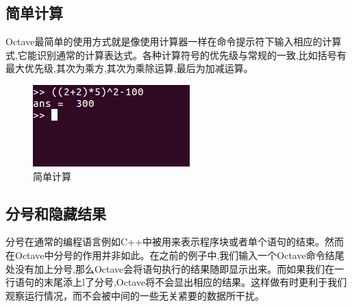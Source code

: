 \documentclass[a4paper,11pt]{ctexart}
\begin{document}
\subsection{简单计算}
Octave最简单的使用方式就是像使用计算器一样在命令提示符下输入相应的计算式,它能识别通常的计算表达式。各种计算符号的优先级与常规的一致,比如括号有最大优先级,其次为乘方,其次为乘除运算,最后为加减运算。
\begin{figure}[H]
	\begin{center}
		\includegraphics[width=.6\textwidth]{simplecal.png}
	\end{center}
	\caption{简单计算}
\end{figure}
\subsection{分号和隐藏结果}
分号在通常的编程语言例如C++中被用来表示程序块或者单个语句的结束。然而在Octave中分号的作用并非如此。在之前的例子中,我们输入一个Octave命令结尾处没有加上分号,那么Octave会将语句执行的结果随即显示出来。而如果我们在一行语句的末尾添上l了分号,Octave将不会显出相应的结果。这样做有时更利于我们观察运行情况，而不会被中间的一些无关紧要的数据所干扰。
\end{document}
